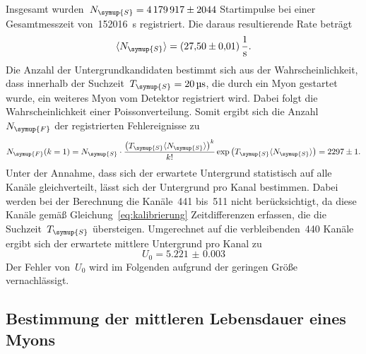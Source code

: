 Insgesamt wurden~$N_{\symup{S}}=\num{4179917(2044)}$ Startimpulse bei einer
Gesamtmesszeit von~\SI{152016}{\second} registriert. Die daraus resultierende
Rate beträgt
%
\begin{equation}
  \langle N_{\symup{S}}\rangle=\SI{27.50(1)}{\per\second}.
  \label{eq:rate_start}
\end{equation}
%
Die Anzahl der Untergrundkandidaten bestimmt sich aus der Wahrscheinlichkeit,
dass innerhalb der Suchzeit~$T_{\symup{S}}=\SI{20}{\micro\second}$, die durch
ein Myon gestartet wurde, ein weiteres Myon vom Detektor registriert wird. Dabei
folgt die Wahrscheinlichkeit einer Poissonverteilung. Somit ergibt sich die
Anzahl~$N_{\symup{F}}$ der registrierten Fehlereignisse zu
%
\begin{equation}
  N_{\symup{F}}(k=1)=N_{\symup{S}}\cdot\frac{\left(T_{\symup{S}}\langle N_{\symup{S}}\rangle\right)^k}{k!}\exp\left(T_{\symup{S}}\langle N_{\symup{S}}\rangle\right)=\num{2297(1)}.
  \label{eq:untergrund_gesamt}
\end{equation}
%
Unter der Annahme, dass sich der erwartete Untergrund statistisch auf alle
Kanäle gleichverteilt, lässt sich der Untergrund pro Kanal bestimmen. Dabei
werden bei der Berechnung die Kanäle~\num{441} bis~\num{511} nicht berücksichtigt, da
diese Kanäle gemäß Gleichung~\ref{eq:kalibrierung} Zeitdifferenzen erfassen, die
die Suchzeit~$T_{\symup{S}}$ übersteigen. Umgerechnet auf die
verbleibenden~\num{440} Kanäle ergibt sich der erwartete mittlere Untergrund pro
Kanal zu
%
\begin{equation}
  U_0=\num{5.221(3)}
  \label{eq:untergrund_kanal}
\end{equation}
%
Der Fehler von~$U_0$ wird im Folgenden aufgrund der geringen Größe
vernachlässigt.

\subsection{Bestimmung der mittleren Lebensdauer eines Myons}

